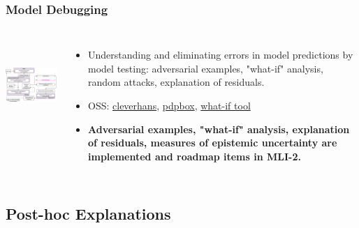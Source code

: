 \documentclass[11pt,
               aspectratio=169,
               hyperref={colorlinks}
               ]{beamer}
\begin{document}
			\begin{frame}
		
				\frametitle{Model Debugging}		
			
				\begin{columns}
	
					\centering
					\includegraphics[height=100pt]{img/md.png}
				
					\vspace{-5pt}
					\begin{itemize}
						\item Understanding and eliminating errors in model predictions by model testing: adversarial examples, "what-if" analysis, random attacks, explanation of residuals.
						\item OSS: \href{https://github.com/tensorflow/cleverhans}{cleverhans}, \href{https://github.com/SauceCat/PDPbox}{pdpbox}, \href{https://pair-code.github.io/what-if-tool/index.html}{what-if tool}
						\item \textbf{Adversarial examples, "what-if" analysis, explanation of residuals, measures of epistemic uncertainty are implemented and roadmap items in MLI-2.}
					
					\end{itemize}
				
				\end{columns}			
			
			\end{frame}
			
		\subsection{Post-hoc Explanations}
			
\end{document}
